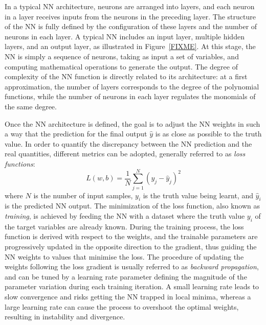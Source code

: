 In a typical NN architecture, neurons are arranged into layers, and each neuron in a layer receives inputs from the neurons in the preceding layer. 
The structure of the NN is fully defined by the configuration of these layers and the number of neurons in each layer. A typical NN includes an input layer, multiple hidden layers, and an output layer, as illustrated in Figure~\ref{FIXME}.
At this stage, the NN is simply a sequence of neurons, taking as input a set of variables, and computing mathematical operations to generate the output. The degree of complexity of the NN function is directly related to its architecture: at a first approximation, the number of layers corresponds to the degree of the polynomial functions, while the number of neurons in each layer regulates the monomials of the same degree. 

Once the NN architecture is defined, the goal is to adjust the NN weights in such a way that the prediction for the final output $\hat{y}$ is as close as possible to the truth value. 
In order to quantify the discrepancy between the NN prediction and the real quantities, different metrics can be adopted, generally referred to as \textit{loss functions}:
\begin{equation}
    L(w,b)=\frac{1}{N}\sum_{j=1}^N(y_j-\hat{y}_j)^2
\end{equation}
where $N$ is the number of input samples, $y_i$ is the truth value being learnt, and $\hat{y}_i$ is the predicted NN output.
The minimization of the loss function, also known as \textit{training}, is achieved by feeding the NN with a dataset where the truth value $y_i$ of the target variables are already known.
During the training process, the loss function is derived with respect to the weights, and the trainable parameters are progressively updated in the opposite direction to the gradient, thus guiding the NN weights to values that minimise the loss. The procedure of updating the weights following the loss gradient is usually referred to as \textit{backward propagation}, and can be tuned by a learning rate parameter defining the magnitude of the parameter variation during each training iteration. A small learning rate leads to slow convergence and risks getting the NN trapped in local minima, whereas a large learning rate can cause the process to overshoot the optimal weights, resulting in instability and divergence.

